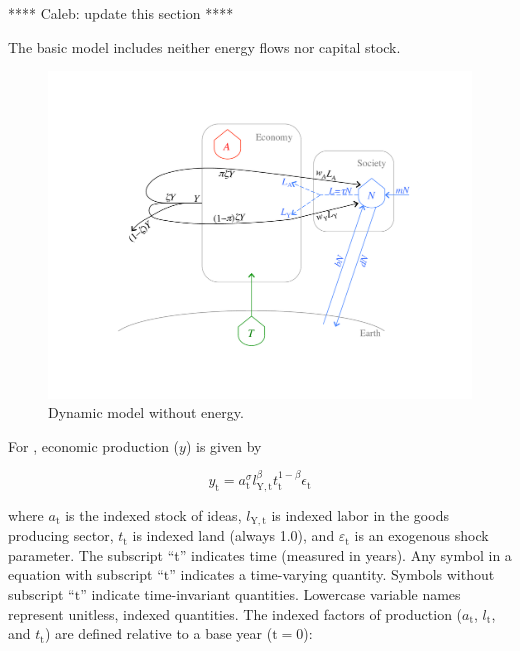 \documentclass[letterpaper,12pt]{article}
\begin{document}
**** Caleb: update this section ****

The basic model includes neither energy flows nor capital stock.

\begin{figure} \label{fig:ModelWithoutEnergy}
  \begin{center}
    \includegraphics[width=\textwidth]{figure_other/ModelWithoutEnergy.pdf}
    \caption{Dynamic model without energy.}
  \end{center}
\end{figure}

For \citet{Jones:2001wn}, economic production ($y$) is given by

\begin{equation} \label{eq:Jones_production_function}
	y_\mathrm{t} = a_\mathrm{t} ^\sigma l_\mathrm{Y,t} ^\beta t_\mathrm{t} ^{1-\beta} \epsilon_\mathrm{t}
\end{equation}

\noindent where $a_\mathrm{t}$ is the indexed stock of ideas, $l_\mathrm{Y,t}$ is indexed labor in the goods producing sector, $t_\mathrm{t}$ is indexed land (always 1.0), and $\varepsilon_\mathrm{t}$ is an exogenous shock parameter. The subscript ``t'' indicates time (measured in years). Any symbol in a equation with subscript ``$\mathrm{t}$'' indicates a time-varying quantity. Symbols without subscript ``$\mathrm{t}$'' indicate time-invariant quantities. Lowercase variable names represent unitless, indexed quantities. The indexed factors of production ($a_\mathrm{t}$, $l_\mathrm{t}$, and $t_\mathrm{t}$) are defined relative to a base year ($\mathrm{t} = 0$):
\end{document}
